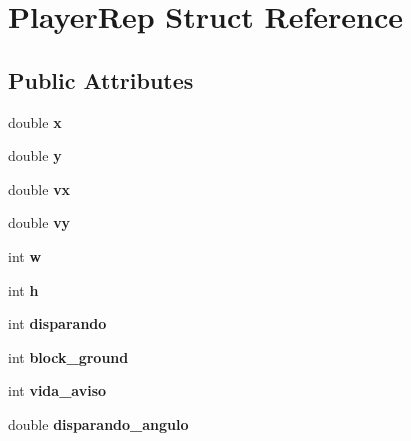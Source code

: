 \hypertarget{struct_player_rep}{}\section{Player\+Rep Struct Reference}
\label{struct_player_rep}
\subsection*{Public Attributes}
\begin{DoxyCompactItemize}
\item 
\mbox{\label{struct_player_rep_ad1d6a48e9067540022643572ebd74015}} 
double {\bfseries x}
\item 
\mbox{\label{struct_player_rep_a116c882425a1d271482fa1a6a19a9895}} 
double {\bfseries y}
\item 
\mbox{\label{struct_player_rep_ac2d9317d2136d67efc187ffebd12cf54}} 
double {\bfseries vx}
\item 
\mbox{\label{struct_player_rep_a3a954a88f82bd08db6b152e2313054b8}} 
double {\bfseries vy}
\item 
\mbox{\label{struct_player_rep_a926bc0161b91fab510cb3faa9da52937}} 
int {\bfseries w}
\item 
\mbox{\label{struct_player_rep_a01d146d16beb64c2d4be68c42feb1368}} 
int {\bfseries h}
\item 
\mbox{\label{struct_player_rep_af989c71a9df045de67f8053266324006}} 
int {\bfseries disparando}
\item 
\mbox{\label{struct_player_rep_aeb270cfd6418902ddbad1b28a32bfa1e}} 
int {\bfseries block\+\_\+ground}
\item 
\mbox{\label{struct_player_rep_a7f22f579a70291231196f1d3cf7ecc72}} 
int {\bfseries vida\+\_\+aviso}
\item 
\mbox{\label{struct_player_rep_abfd92962ba2eb58a34f24ccf8ccdfae9}} 
double {\bfseries disparando\+\_\+angulo}

\end{DoxyCompactItemize}
